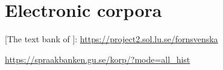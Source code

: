 \documentclass[output=paper,colorlinks,citecolor=brown,draft,draftmode]{langscibook}
\begin{document}
\section*{Electronic corpora}

\begin{description}[font=\normalfont]
\item[FTB:]  [The text bank of ]: \url{https://project2.sol.lu.se/fornsvenska} 
\item[\isi{Korp}:] \url{https://spraakbanken.gu.se/korp/?mode=all_hist}
\end{description}


{\sloppy\printbibliography[heading=subbibliography,notkeyword=this]}
\end{document}

